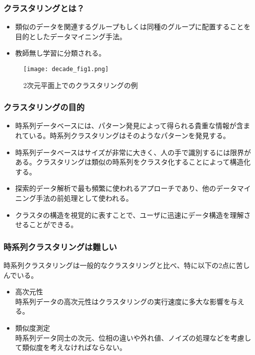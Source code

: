 \documentclass[dvipdfmx,11pt,notheorems]{beamer}
\theoremstyle{definition}
\begin{document}
\begin{frame}\frametitle{クラスタリングとは？}
\begin{itemize}
\item 類似のデータを関連するグループもしくは同種のグループに配置することを目的としたデータマイニング手法。
\item 教師無し学習に分類される。
\end{itemize}
\begin{figure}[h]
\begin{center}
\texttt{[image: decade\_fig1.png]}
\end{center}
\caption{2次元平面上でのクラスタリングの例}
\end{figure}
\end{frame}


\begin{frame}\frametitle{クラスタリングの目的}
\begin{itemize}
\item 時系列データベースには、パターン発見によって得られる貴重な情報が含まれている。時系列クラスタリングはそのようなパターンを発見する。
\item 時系列データベースはサイズが非常に大きく、人の手で識別するには限界がある。クラスタリングは類似の時系列をクラスタ化することによって構造化する。
\item 探索的データ解析で最も頻繁に使われるアプローチであり、他のデータマイニング手法の前処理として使われる。
\item クラスタの構造を視覚的に表すことで、ユーザに迅速にデータ構造を理解させることができる。
\end{itemize}
\end{frame}


\begin{frame}\frametitle{時系列クラスタリングは難しい}
時系列クラスタリングは一般的なクラスタリングと比べ、特に以下の2点に苦しんでいる。\\
\begin{itemize}
\item 高次元性\\
時系列データの高次元性はクラスタリングの実行速度に多大な影響を与える。
\item 類似度測定\\
時系列データ同士の次元、位相の違いや外れ値、ノイズの処理などを考慮して類似度を考えなければならない。
\end{itemize}
\end{frame}
\end{document}
